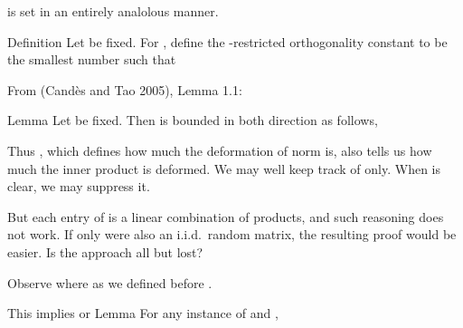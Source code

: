  is set in an entirely analolous manner.

\stopsubsection

\startsubsection [title={Suffice It to Ignore DFT Matrix}]

\Result
{Definition}
{
Let  be fixed.
For , define the -restricted orthogonality constant  to be the smallest number such that
}

From  (Cand\`es and Tao 2005), Lemma 1.1:

\Result
{Lemma}
{
Let  be fixed.
Then  is bounded in both direction as follows,
}

Thus , which defines how much the deformation of norm is, also tells us how much the inner product is deformed.
We may well keep track of  only.
When  is clear, we may suppress it.

But each entry of  is a linear combination of products, and such reasoning does not work.
If only  were also an i.i.d.\ random matrix, the resulting proof would be easier.
Is the approach all but lost?

Observe
where as we defined before .

This implies
or
\Result
{Lemma}
{
For any instance of  and ,
}
\stopsubsection

